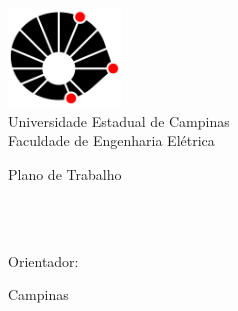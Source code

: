 \thispagestyle{empty}
\begin{center}

\includegraphics[width=3.0cm]{logo-unicamp.png}\\
\medskip
Universidade Estadual de Campinas\\
Faculdade de Engenharia Elétrica\\


\vfill

{Plano de Trabalho} \\

\vfill


\textbf{\MakeUppercase{\TITULO}}\\

\vfill


\Autor\\

Orientador: \Orientador

\vfill

Campinas\\
\Ano\\

\end{center}
\newpage
